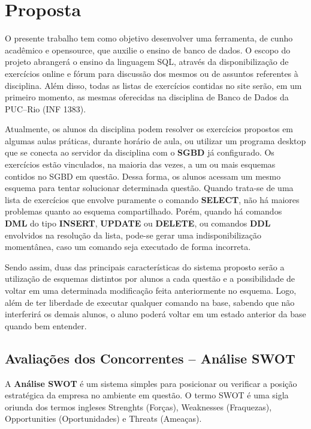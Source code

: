 \documentclass[graduacao,brazil]{ThesisPUC}
\begin{document}
\chapter{Proposta}

O presente trabalho tem como objetivo desenvolver uma ferramenta, de cunho acad\^{e}mico
e opensource, que auxilie o ensino de banco de dados. O escopo do projeto abranger\'{a} o ensino
da linguagem SQL, atrav\'{e}s da disponibiliza\c{c}\~{a}o de exerc\'{i}cios online e f\'{o}rum para discuss\~{a}o dos
mesmos ou de assuntos referentes \`{a} disciplina. Al\'{e}m disso, todas as listas de exerc\'{i}cios contidas
no site ser\~{a}o, em um primeiro momento, as mesmas oferecidas na disciplina de Banco de Dados
da PUC--Rio (INF 1383).

Atualmente, os alunos da disciplina podem resolver os exerc\'{i}cios propostos em algumas
aulas pr\'{a}ticas, durante hor\'{a}rio de aula, ou utilizar um programa desktop que se conecta ao
servidor da disciplina com o \textbf{SGBD} j\'{a} configurado. Os exerc\'{i}cios est\~{a}o vinculados, na maioria das
vezes, a um ou mais esquemas contidos no SGBD em quest\~{a}o. Dessa forma, os alunos acessam
um mesmo esquema para tentar solucionar determinada quest\~{a}o. Quando trata-se de uma lista de
exerc\'{i}cios que envolve puramente o comando \textbf{SELECT}, n\~{a}o h\'{a} maiores problemas quanto ao
esquema compartilhado. Por\'{e}m, quando h\'{a} comandos \textbf{DML} do tipo \textbf{INSERT}, \textbf{UPDATE} ou
\textbf{DELETE}, ou comandos \textbf{DDL} envolvidos na resolu\c{c}\~{a}o da lista, pode-se gerar uma
indisponibiliza\c{c}\~{a}o moment\^{a}nea, caso um comando seja executado de forma incorreta.

Sendo assim, duas das principais caracter\'{i}sticas do sistema proposto ser\~{a}o a utiliza\c{c}\~{a}o de
esquemas distintos por alunos a cada quest\~{a}o e a possibilidade de voltar em uma determinada
modifica\c{c}\~{a}o feita anteriormente no esquema. Logo, al\'{e}m de ter liberdade de executar qualquer
comando na base, sabendo que n\~{a}o interferir\'{a} os demais alunos, o aluno poder\'{a} voltar em um
estado anterior da base quando bem entender.

\section{Avalia\c{c}\~{o}es dos Concorrentes -- An\'{a}lise SWOT}

A \textbf{An\'{a}lise SWOT} \'{e} um sistema simples para posicionar ou verificar a posi\c{c}\~{a}o estrat\'{e}gica
da empresa no ambiente em quest\~{a}o. O termo SWOT \'{e} uma sigla oriunda dos termos ingleses
Strenghts (Forças), Weaknesses (Fraquezas), Opportunities (Oportunidades) e Threats (Ameaças).
\end{document}
